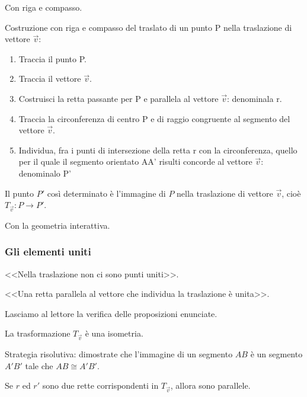 Con riga e compasso.

\begin{procedura}
  Costruzione con riga e compasso del traslato di un punto P nella traslazione 
di vettore \(\vec{v}\):
  \begin{enumerate} [nosep]
    \item 
    Traccia il punto P.
    \item 
    Traccia il vettore \(\vec{v}\).
    \item 
    Costruisci la retta passante per P e parallela al vettore \(\vec{v}\): 
denominala r.
    \item 
    Traccia la circonferenza di centro P e di raggio congruente al segmento del 
vettore \(\vec{v}\).
    \item 
    Individua, fra i punti di intersezione della retta r con la circonferenza, 
quello per il quale il segmento orientato AA' risulti concorde al vettore 
\(\vec{v}\): denominalo P' 
  \end{enumerate}
  Il punto \(P'\) così determinato è l'immagine di \(P\) nella traslazione di 
vettore \(\vec{v}\), 
  cioè \(T_{\vec{v}}:P\rightarrow P'\).
\end{procedura}

Con la geometria interattiva.


\subsubsection{Gli elementi uniti}

\begin{itemize*}
\item <<Nella traslazione non ci sono punti uniti>>.
\item <<Una retta parallela al vettore che individua la traslazione è 
unita>>.
\end{itemize*}

Lasciamo al lettore la verifica delle proposizioni enunciate.

\begin{teorema}
La trasformazione \(T_{\vec{v}}\) è una isometria.
\end{teorema}

Strategia risolutiva: dimostrate che l'immagine di un segmento \(AB\) è 
un segmento \(A'B'\) tale che \(AB\cong A'B'\).

\begin{teorema}
Se \(r\) ed \(r'\) sono due rette corrispondenti in \(T_{\vec{v}}\), allora 
sono parallele.
\end{teorema}

